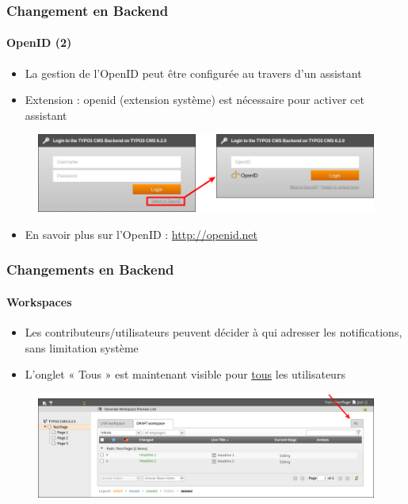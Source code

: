 
\begin{frame}[fragile]
	\frametitle{Changement en Backend}
	\framesubtitle{OpenID (2)}

 	\begin{itemize}
		\item La gestion de l'OpenID peut être configurée au travers d'un assistant
		\item Extension : openid (extension système) est nécessaire pour activer cet assistant
	\end{itemize}

	\begin{figure}
		\includegraphics[width=0.8\linewidth]{Images/BackendChanges/OpenIdLogin.png}
	\end{figure}

 	\begin{itemize}
		\item En savoir plus sur l'OpenID :\newline
			\small\url{http://openid.net}\normalsize
	\end{itemize}

\end{frame}


\begin{frame}[fragile]
	\frametitle{Changements en Backend}
	\framesubtitle{Workspaces}

 	\begin{itemize}
		\item Les contributeurs/utilisateurs peuvent décider à qui adresser les notifications, sans limitation système
		\item L'onglet « Tous » est maintenant visible pour \underline{tous} les utilisateurs
	\end{itemize}

	\begin{figure}
		\includegraphics[width=0.95\linewidth]{Images/BackendChanges/WorkspacesTabAll.png}
	\end{figure}

\end{frame}


